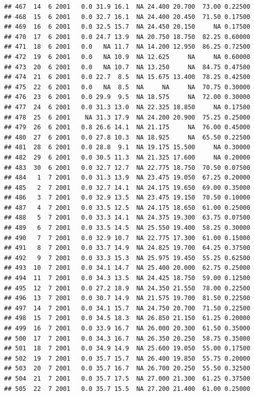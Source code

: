 \documentclass[
]{book}
\begin{document}
\begin{verbatim}
## 467  14  6 2001   0.0 31.9 16.1  NA 24.400 20.700  73.00 0.22500
## 468  15  6 2001   0.0 32.7 16.1  NA 24.400 20.450  71.50 0.17500
## 469  16  6 2001   0.0 32.5 15.7  NA 24.450 20.150     NA 0.17500
## 470  17  6 2001   0.0 24.7 13.9  NA 20.750 18.750  82.25 0.60000
## 471  18  6 2001   0.0   NA 11.7  NA 14.200 12.950  86.25 0.72500
## 472  19  6 2001   0.0   NA 10.9  NA 12.625     NA     NA 0.60000
## 473  20  6 2001   0.0   NA 10.7  NA 13.250     NA  84.75 0.47500
## 474  21  6 2001   0.0 22.7  8.5  NA 15.675 13.400  78.25 0.42500
## 475  22  6 2001   0.0   NA  8.5  NA     NA     NA  70.75 0.30000
## 476  23  6 2001   0.0 29.9  9.5  NA 18.575     NA  72.00 0.30000
## 477  24  6 2001   0.0 31.3 13.0  NA 22.325 18.850     NA 0.17500
## 478  25  6 2001    NA 31.3 17.9  NA 24.200 20.900  75.25 0.25000
## 479  26  6 2001   0.8 26.6 14.1  NA 21.175     NA  76.00 0.45000
## 480  27  6 2001   0.0 27.8 10.3  NA 18.925     NA  65.50 0.22500
## 481  28  6 2001   0.0 28.8  9.1  NA 19.175 15.500     NA 0.30000
## 482  29  6 2001   0.0 30.5 11.3  NA 21.325 17.600     NA 0.20000
## 483  30  6 2001   0.0 32.7 12.7  NA 22.775 18.750  70.50 0.07500
## 484   1  7 2001   0.0 31.3 13.9  NA 23.475 19.050  67.25 0.20000
## 485   2  7 2001   0.0 32.7 14.1  NA 24.175 19.650  69.00 0.35000
## 486   3  7 2001   0.0 32.9 13.5  NA 23.475 19.150  70.50 0.10000
## 487   4  7 2001   0.0 33.5 12.5  NA 24.175 18.650  61.00 0.25000
## 488   5  7 2001   0.0 33.3 14.1  NA 24.375 19.300  63.75 0.07500
## 489   6  7 2001   0.0 33.5 14.5  NA 25.550 19.400  58.25 0.30000
## 490   7  7 2001   0.0 32.9 10.7  NA 22.775 17.300  61.00 0.15000
## 491   8  7 2001   0.0 33.7 14.9  NA 24.825 19.700  64.25 0.37500
## 492   9  7 2001   0.0 33.3 15.3  NA 25.975 19.450  55.25 0.62500
## 493  10  7 2001   0.0 34.1 14.7  NA 25.400 20.000  62.75 0.25000
## 494  11  7 2001   0.0 34.3 13.5  NA 24.425 18.750  59.00 0.12500
## 495  12  7 2001   0.0 27.2 18.9  NA 24.350 21.550  78.00 0.22500
## 496  13  7 2001   0.0 30.7 14.9  NA 21.575 19.700  81.50 0.22500
## 497  14  7 2001   0.0 34.1 15.7  NA 24.750 20.700  71.50 0.22500
## 498  15  7 2001   0.0 34.5 18.3  NA 26.850 21.150  61.25 0.20000
## 499  16  7 2001   0.0 33.9 16.7  NA 26.000 20.300  61.50 0.35000
## 500  17  7 2001   0.0 34.3 16.7  NA 26.350 20.250  58.75 0.35000
## 501  18  7 2001   0.0 34.9 14.9  NA 25.600 19.050  55.00 0.17500
## 502  19  7 2001   0.0 35.7 15.7  NA 26.400 19.850  55.75 0.20000
## 503  20  7 2001   0.0 35.7 16.7  NA 26.700 20.250  55.50 0.32500
## 504  21  7 2001   0.0 35.7 17.5  NA 27.000 21.300  61.25 0.37500
## 505  22  7 2001   0.0 35.7 15.5  NA 27.200 21.400  61.00 0.25000

\end{verbatim}
\end{document}
